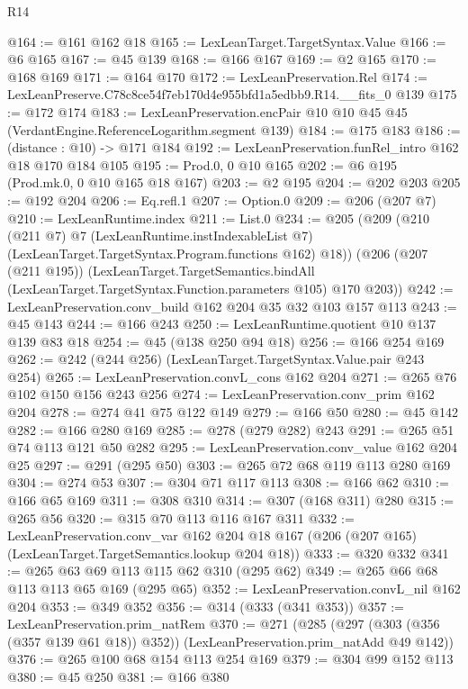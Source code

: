 \begin{lexlean}{R14}
\begin{coremodule}
@164 := @161 @162 @18
@165 := LexLeanTarget.TargetSyntax.Value
@166 := @6 @165
@167 := @45 @139
@168 := @166 @167
@169 := @2 @165
@170 := @168 @169
@171 := @164 @170
@172 := LexLeanPreservation.Rel
@174 := LexLeanPreserve.C78c8ce54f7eb170d4e955bfd1a5edbb9.R14.__fits_0 @139
@175 := @172 @174
@183 := LexLeanPreservation.encPair @10 @10 @45 @45 (VerdantEngine.ReferenceLogarithm.segment @139)
@184 := @175 @183
@186 := (distance : @10) -> @171 @184
@192 := LexLeanPreservation.funRel_intro @162 @18 @170 @184 @105
@195 := Prod.{0, 0} @10 @165
@202 := @6 @195 (Prod.mk.{0, 0} @10 @165 @18 @167)
@203 := @2 @195
@204 := @202 @203
@205 := @192 @204
@206 := Eq.refl.{1}
@207 := Option.{0}
@209 := @206 (@207 @7)
@210 := LexLeanRuntime.index
@211 := List.{0}
@234 := @205
    (@209
      (@210
        (@211 @7)
        @7
        (LexLeanRuntime.instIndexableList @7)
        (LexLeanTarget.TargetSyntax.Program.functions @162)
        @18))
    (@206
      (@207 (@211 @195))
      (LexLeanTarget.TargetSemantics.bindAll
        (LexLeanTarget.TargetSyntax.Function.parameters @105)
        @170
        @203))
@242 := LexLeanPreservation.conv_build @162 @204 @35 @32 @103 @157 @113
@243 := @45 @143
@244 := @166 @243
@250 := LexLeanRuntime.quotient @10 @137 @139 @83 @18
@254 := @45 (@138 @250 @94 @18)
@256 := @166 @254 @169
@262 := @242 (@244 @256) (LexLeanTarget.TargetSyntax.Value.pair @243 @254)
@265 := LexLeanPreservation.convL_cons @162 @204
@271 := @265 @76 @102 @150 @156 @243 @256
@274 := LexLeanPreservation.conv_prim @162 @204
@278 := @274 @41 @75 @122 @149
@279 := @166 @50
@280 := @45 @142
@282 := @166 @280 @169
@285 := @278 (@279 @282) @243
@291 := @265 @51 @74 @113 @121 @50 @282
@295 := LexLeanPreservation.conv_value @162 @204 @25
@297 := @291 (@295 @50)
@303 := @265 @72 @68 @119 @113 @280 @169
@304 := @274 @53
@307 := @304 @71 @117 @113
@308 := @166 @62
@310 := @166 @65 @169
@311 := @308 @310
@314 := @307 (@168 @311) @280
@315 := @265 @56
@320 := @315 @70 @113 @116 @167 @311
@332 := LexLeanPreservation.conv_var
    @162
    @204
    @18
    @167
    (@206 (@207 @165) (LexLeanTarget.TargetSemantics.lookup @204 @18))
@333 := @320 @332
@341 := @265 @63 @69 @113 @115 @62 @310 (@295 @62)
@349 := @265 @66 @68 @113 @113 @65 @169 (@295 @65)
@352 := LexLeanPreservation.convL_nil @162 @204
@353 := @349 @352
@356 := @314 (@333 (@341 @353))
@357 := LexLeanPreservation.prim_natRem
@370 := @271
    (@285 (@297 (@303 (@356 (@357 @139 @61 @18)) @352)) (LexLeanPreservation.prim_natAdd @49 @142))
@376 := @265 @100 @68 @154 @113 @254 @169
@379 := @304 @99 @152 @113
@380 := @45 @250
@381 := @166 @380

\end{coremodule}
\end{lexlean}
